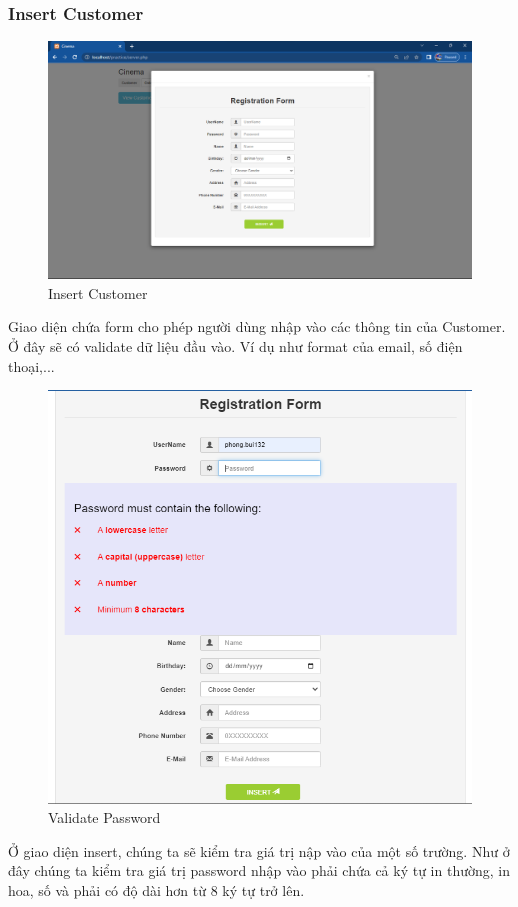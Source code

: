 \subsubsection{Insert Customer}
\begin{figure}[H]
    \centering
    \includegraphics[scale=0.45]{images/insertCustomer.png}
    \caption{Insert Customer}
\end{figure}

Giao diện chứa form cho phép người dùng nhập vào các thông tin của Customer. Ở đây sẽ có validate dữ liệu đầu vào. Ví dụ như format của email, số điện thoại,...


\begin{figure}[H]
    \centering
    \includegraphics[scale=0.45]{images/insertValidatePassword.png}
    \caption{Validate Password}
\end{figure}
Ở giao diện insert, chúng ta sẽ kiểm tra giá trị nập vào của một số trường. Như ở đây chúng ta kiểm tra giá trị password nhập vào phải chứa cả ký tự in thường, in hoa, số và phải có độ dài hơn từ 8 ký tự trở lên.

